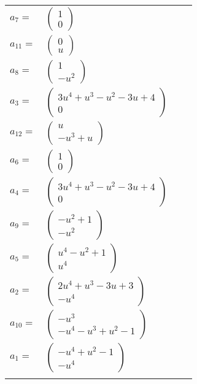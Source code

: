\documentclass[1p]{elsarticle_modified}
\theoremstyle{definition}
\begin{document}
\begin{tabular}{m{7pt} m{180pt} m{7pt} m{180pt} }
\flushright $a_{7}=$&$\begin{pmatrix}1\\0\end{pmatrix}$ \\
\flushright $a_{11}=$&$\begin{pmatrix}0\\u\end{pmatrix}$ \\
\flushright $a_{8}=$&$\begin{pmatrix}1\\- u^2\end{pmatrix}$ \\
\flushright $a_{3}=$&$\begin{pmatrix}3 u^4+u^3- u^2-3 u+4\\0\end{pmatrix}$ \\
\flushright $a_{12}=$&$\begin{pmatrix}u\\- u^3+u\end{pmatrix}$ \\
\flushright $a_{6}=$&$\begin{pmatrix}1\\0\end{pmatrix}$ \\
\flushright $a_{4}=$&$\begin{pmatrix}3 u^4+u^3- u^2-3 u+4\\0\end{pmatrix}$ \\
\flushright $a_{9}=$&$\begin{pmatrix}- u^2+1\\- u^2\end{pmatrix}$ \\
\flushright $a_{5}=$&$\begin{pmatrix}u^4- u^2+1\\u^4\end{pmatrix}$ \\
\flushright $a_{2}=$&$\begin{pmatrix}2 u^4+u^3-3 u+3\\- u^4\end{pmatrix}$ \\
\flushright $a_{10}=$&$\begin{pmatrix}- u^3\\- u^4- u^3+u^2-1\end{pmatrix}$ \\
\flushright $a_{1}=$&$\begin{pmatrix}- u^4+u^2-1\\- u^4\end{pmatrix}$\\&\end{tabular}
\end{document}
